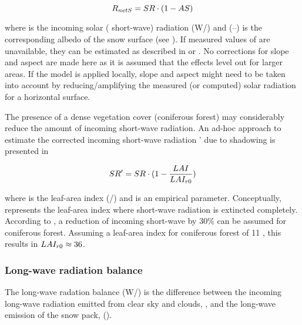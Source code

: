 \begin{equation} \label{eqn:snow-enBal_netRadiationShort}
  R_{netS} = SR \cdot (1-AS)
\end{equation}

where \solarRadiation{} is the incoming solar (\ie{} short-wave) radiation (W/\sqm) and \snowAlbedo{} (--) is the corresponding albedo of the snow surface (see ). If measured values of \solarRadiation{} are unavailable, they can be estimated as described in \citet{Tarboton1996} or \citet{Dyck1995}. No corrections for slope and aspect are made here as it is assumed that the effects level out for larger areas. If the model is applied locally, slope and aspect might need to be taken into account by reducing/amplifying the measured (or computed) solar radiation for a horizontal surface.

The presence of a dense vegetation cover (coniferous forest) may considerably reduce the amount of incoming short-wave radiation. An ad-hoc approach to estimate the corrected incoming short-wave radiation \solarRadiation' due to shadowing is presented in 

\begin{equation} \label{eqn:snow-enBal_shadowing}
  SR' = SR \cdot (1-\frac{LAI}{LAI_{r0}})
\end{equation}

where \leafAreaIndex{} is the leaf-area index (\sqm/\sqm) and \leafAreaIndexFullShadow{} is an empirical parameter. Conceptually, \leafAreaIndexFullShadow{} represents the leaf-area index where short-wave radiation is extincted completely. According to \citet{Ludwig2006}, a reduction of incoming short-wave by 30\% can be assumed for coniferous forest. Assuming a leaf-area index for coniferous forest of 11 \citep[][page 11]{Ludwig2006}, this results in $LAI_{r0} \approx 36$.


\subsubsection{Long-wave radiation balance}

The long-wave radation balance \netRadiationLong{} (W/\sqm) is the difference between the incoming long-wave radiation emitted from clear sky and clouds, \radLongwaveIn, and the long-wave emission of the snow pack, \radLongwaveOut{} ().

